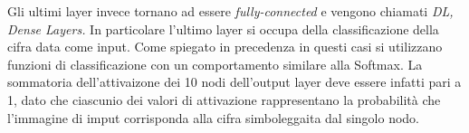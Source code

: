 \documentclass[12pt,a4paper,openright,twoside]{report}
\begin{document}
Gli ultimi layer invece tornano ad essere \emph{fully-connected} e vengono chiamati \emph{DL, Dense Layers.}
In particolare l'ultimo layer si occupa della classificazione della cifra data come input. Come spiegato in precedenza in questi casi si utilizzano funzioni di classificazione con un comportamento similare alla Softmax. La sommatoria dell'attivaizone dei 10 nodi dell'output layer deve essere infatti pari a 1, dato che ciascunio dei valori di attivazione rappresentano la probabilità che l'immagine di imput corrisponda alla cifra simboleggaita dal singolo nodo.
\end{document}
